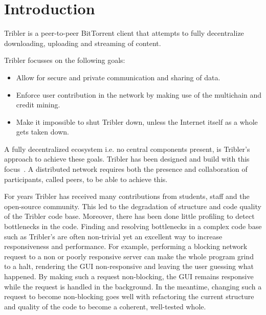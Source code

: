 \chapter{Introduction}
\label{chp:introduction}
Tribler is a peer-to-peer BitTorrent client that attempts to fully decentralize downloading, uploading and streaming of content.

Tribler focusses on the following goals:
\begin{itemize}
    \item Allow for secure and private communication and sharing of data.
    \item Enforce user contribution in the network by making use of the multichain and credit mining.
    \item Make it impossible to shut Tribler down, unless the Internet itself as a whole gets taken down.
\end{itemize}

A fully decentralized ecosystem i.e. no central components present, is Tribler's approach to achieve these goals.
Tribler has been designed and build with this focus~\cite{Pouwelse-tribler,Bakker-tribler}.
A distributed network requires both the presence and collaboration of participants, called peers, to be able to achieve this.


For years Tribler has received many contributions from students, staff and the open-source community.
This led to the degradation of structure and code quality of the Tribler code base.
Moreover, there has been done little profiling to detect bottlenecks in the code.
Finding and resolving bottlenecks in a complex code base such as Tribler's are often non-trivial yet an excellent way to increase responsiveness and performance.
For example, performing a blocking network request to a non or poorly responsive server can make the whole program grind to a halt, rendering the GUI non-responsive and leaving the user guessing what happened.
By making such a request non-blocking, the GUI remains responsive while the request is handled in the background.
In the meantime, changing such a request to become non-blocking goes well with refactoring the current structure and quality of the code to become a coherent, well-tested whole.\\

